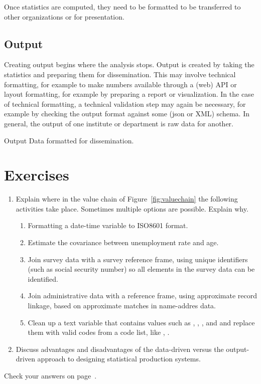 Once statistics are computed, they need to be formatted to be transferred to
other organizations or for presentation.

\subsection*{Output}
Creating output begins where the analysis stops. Output is created by taking
the statistics and preparing them for dissemination. This may involve technical
formatting, for example to make numbers available through a (web) API or layout
formatting, for example by preparing a report or visualization. In the case of
technical formatting, a technical validation step may again be necessary, for
example by checking the output format against some (json or XML) schema. In
general, the output of one institute or department is raw data for another.
\begin{terminology}{Output}
Data formatted for dissemination.
\end{terminology}

\newpage{}
\section{Exercises}
\label{sect:exsvc}
\begin{enumerate}
  \item Explain where in the value chain of Figure~\ref{fig:valuechain} the following 
  activities take place. Sometimes multiple options are possible. Explain why.
  \begin{enumerate}
    \item Formatting a date-time variable to ISO8601 format.
    \item Estimate the covariance between unemployment rate and age.
    \item Join survey data with a survey reference frame, using unique identifiers
          (such as social security number) so all elements in the survey data can be
          identified.
    \item Join administrative data with a reference frame, using approximate record linkage,
          based on approximate matches in name-addres data.
    \item Clean up a text variable that contains values such as , ,
          , and  and replace them with valid codes from a code
          list, like  , .
  \end{enumerate}
  \item Discuss advantages and disadvantages of the data-driven versus the
        output-driven approach to designing statistical production systems.
\end{enumerate}

\hfill{}Check your answers on page~\pageref{sect:anssvc}.
